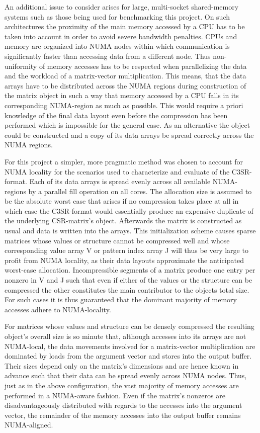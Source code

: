     An additional issue to consider arises for large, multi-socket shared-memory systems such as those being used for
    benchmarking this project. On such architectures the proximity of the main memory accessed by a CPU has to be taken
    into account in order to avoid severe bandwidth penalties. CPUs and memory are organized into NUMA nodes within
    which communication is significantly faster than accessing data from a different node. Thus non-uniformity of memory
    accesses has to be respected when parallelizing the data and the workload of a matrix-vector multiplication. This
    means, that the data arrays have to be distributed across the NUMA regions during construction of the matrix object
    in such a way that memory accessed by a CPU falls in its corresponding NUMA-region as much as possible. This
    would require a priori knowledge of the final data layout even before the compression has been performed which is
    impossible for the general case. As an alternative the object could be constructed and a copy of its data arrays be
    spread correctly across the NUMA regions.

    For this project a simpler, more pragmatic method was chosen to account for NUMA locality for the scenarios used to
    characterize and evaluate of the C3SR-format. Each of its data arrays is spread evenly across all available
    NUMA-regions by a parallel fill operation on all cores. The allocation size is assumed to be the absolute worst case
    that arises if no compression takes place at all in which case the C3SR-format would essentially produce an
    expensive duplicate of the underlying CSR-matrix's object. Afterwards the matrix is constructed as usual and data
    is written into the arrays. This initialization scheme causes sparse matrices whose values or structure cannot be
    compressed well and whose corresponding value array V or pattern index array J will thus be very large to profit
    from NUMA locality, as their data layouts approximate the anticipated worst-case allocation. Incompressible segments
    of a matrix produce one entry per nonzero in V and J such that even if either of the values or the structure can be
    compressed the other constitutes the main contributor to the objects total size. For such cases it is thus
    guaranteed that the dominant majority of memory accesses adhere to NUMA-locality.

    For matrices whose values and structure can be densely compressed the resulting object's overall size is so minute
    that, although accesses into its arrays are not NUMA-local, the data movements involved for a matrix-vector
    multiplication are dominated by loads from the argument vector and stores into the output buffer. Their sizes depend
    only on the matrix's dimensions and are hence known in advance such that their data can be spread evenly across NUMA
    nodes. Thus, just as in the above configuration, the vast majority of memory accesses are performed in a NUMA-aware
    fashion. Even if the matrix's nonzeros are disadvantageously distributed with regards to the accesses into the
    argument vector, the remainder of the memory accesses into the output buffer remains NUMA-aligned.

